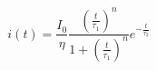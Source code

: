 \begin{equation}
i(t) = \frac{I_0}{\eta} \frac{\left (\frac{t}{\tau_1} \right )^n}{1 + \left (\frac{t}{\tau_1} \right )^n} e^{-\frac{t}{\tau_2}} 
\label{eqn:HF}
\end{equation}